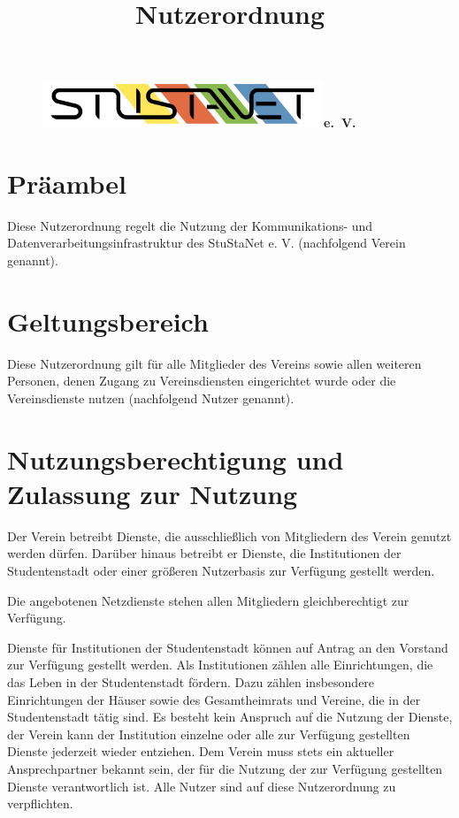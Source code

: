\documentclass[a4paper,10pt]{scrartcl}
\title{Nutzerordnung}
\date{}
\begin{document}

\maketitle
\vspace{-60pt}

\begin{figure}[t!]
   \centering
   \vspace{-40pt}
   \mbox{\includegraphics[width=0.75\textwidth,keepaspectratio]{StuStaNet_Logo}\Huge \sffamily \textbf{e. V.}}
   \vspace{-40pt}
\end{figure}


\section*{Präambel}
Diese Nutzerordnung regelt die Nutzung der Kommunikations- und Datenverarbeitungsinfrastruktur des StuStaNet e. V. (nachfolgend Verein genannt).

\section{Geltungsbereich}
Diese Nutzerordnung gilt für alle Mitglieder des Vereins sowie allen weiteren Personen, denen Zugang zu Vereinsdiensten eingerichtet wurde oder die Vereinsdienste nutzen (nachfolgend Nutzer genannt).

\section{Nutzungsberechtigung und Zulassung zur Nutzung}
Der Verein betreibt Dienste, die ausschließlich von Mitgliedern des Verein genutzt werden dürfen. Darüber hinaus betreibt er Dienste, die Institutionen der Studentenstadt oder einer größeren Nutzerbasis zur Verfügung gestellt werden.

Die angebotenen Netzdienste stehen allen Mitgliedern gleichberechtigt zur Verfügung.

Dienste für Institutionen der Studentenstadt können auf Antrag an den Vorstand zur Verfügung gestellt werden. Als Institutionen zählen alle Einrichtungen, die das Leben in der Studentenstadt fördern. Dazu zählen insbesondere Einrichtungen der Häuser sowie des Gesamtheimrats und Vereine, die in der Studentenstadt tätig sind. 
Es besteht kein Anspruch auf die Nutzung der Dienste, der Verein kann der Institution einzelne oder alle zur Verfügung gestellten Dienste jederzeit wieder entziehen. Dem Verein muss stets ein aktueller Ansprechpartner bekannt sein, der für die Nutzung der zur Verfügung gestellten Dienste verantwortlich ist. Alle Nutzer sind auf diese Nutzerordnung zu verpflichten.
\end{document}
